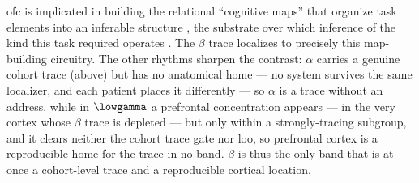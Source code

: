 \gls{ofc} is implicated in building the relational ``cognitive maps'' that organize task elements into an inferable structure \cite{wilson2014orbitofrontal,schuck2016human}, the substrate over which inference of the kind this task required operates \cite{park2021inferences}. The \(\beta\) trace localizes to precisely this map-building circuitry. The other rhythms sharpen the contrast: \(\alpha\) carries a genuine cohort trace (above) but has no anatomical home --- no system survives the same localizer, and each patient places it differently --- so \(\alpha\) is a trace without an address, while in \(\lowgamma\) a prefrontal concentration appears --- in the very cortex whose \(\beta\) trace is depleted --- but only within a strongly-tracing subgroup, and it clears neither the cohort trace gate nor \gls{loo}, so prefrontal cortex is a reproducible home for the trace in no band. \(\beta\) is thus the only band that is at once a cohort-level trace and a reproducible cortical location.

